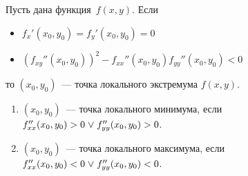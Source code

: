 \begin{theorem}
Пусть дана функция~$f(x, y)$. Если
\begin{itemize}
	\item $\displaystyle f_x'(x_0, y_0) = f_y'(x_0, y_0) = 0$
	\item $\displaystyle (f_{xy}''(x_0, y_0))^2 - f_{xx}''(x_0, y_0) f_{yy}''(x_0, y_0) < 0$
\end{itemize}
то $(x_0, y_0)$~--- точка локального экстремума $f(x, y)$.
	
\begin{enumerate}
	\item $(x_0, y_0)$~--- точка локального минимума,
	если $f_{xx}''(x_0, y_0) \opbr> 0 \lOr f_{yy}''(x_0, y_0) \opbr> 0$.
	\item $(x_0, y_0)$~--- точка локального максимума,
	если $f_{xx}''(x_0, y_0) \opbr< 0 \lOr f_{yy}''(x_0, y_0) \opbr< 0$.
\end{enumerate}
\end{theorem}

